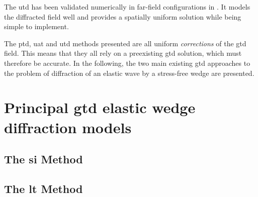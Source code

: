 The \acrfull{utd} has been validated numerically in far-field configurations in \cite{AKDthese}. It models the diffracted field well and provides a spatially uniform solution while being simple to implement.

The \acrshort{ptd}, \acrshort{uat} and \acrshort{utd} methods presented are all uniform \textit{corrections} of the \acrshort{gtd} field. This means that they all rely on a preexisting \acrshort{gtd} solution, which must therefore be accurate. In the following, the two main existing \acrshort{gtd} approaches to the problem of diffraction of an elastic wave by a stress-free wedge are presented.

\section{Principal \acrshort{gtd} elastic wedge diffraction models}
\subsection{The \acrfull{si} Method}
\subsection{The \acrfull{lt} Method}